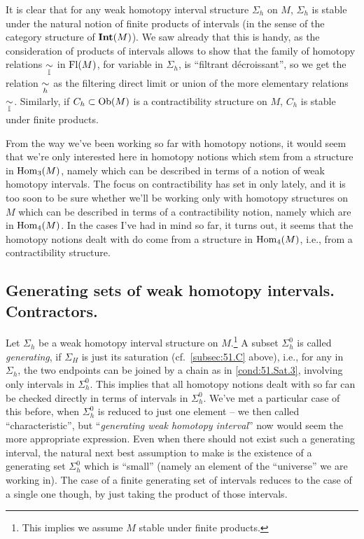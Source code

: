 It is clear that for any weak homotopy interval structure $\Sigma_h$
on $M$, $\Sigma_h$ is stable under the natural notion of finite
products of intervals (in the sense of the category structure of
$\operatorname{\mathbf{Int}}(M)$). We saw already that this is handy, as the consideration
of products of intervals allows to show that the family of homotopy
relations $\mathrel{\underset{{\mathbb{I}}}{\sim}}$ in $\operatorname{Fl}(M)$, for variable \bI{} in $\Sigma_h$, is
``filtrant d\'ecroissant'', so we get the relation $\mathrel{\underset{h}{\sim}}$ as the
filtering direct limit or union of the more elementary relations
$\mathrel{\underset{{\mathbb{I}}}{\sim}}$. Similarly, if $C_h\subset\operatorname{Ob}(M)$ is a contractibility
structure on $M$, $C_h$ is stable under finite products.
\begin{remark}
  From the way we've been working so far with homotopy notions, it
  would seem that we're only interested here in homotopy notions which
  stem from a structure in $\operatorname{Hom}_3(M)$, namely which can be described
  in terms of a notion of weak homotopy intervals. The focus on
  contractibility has set in only lately, and it is too soon to be
  sure whether we'll be working only with homotopy structures on $M$
  which can be described in terms of a contractibility notion, namely
  which are in $\operatorname{Hom}_4(M)$. In the cases I've had in mind so far, it
  turns out, it seems that the homotopy notions dealt with do come
  from a structure in $\operatorname{Hom}_4(M)$, i.e., from a contractibility
  structure.
\end{remark}

\subsection[Generating sets of homotopy intervals. Two standard ways
of generating multiplicative intervals. Contractibility of
\texorpdfstring{$\Hom(X,Y)$}{Hom(X,Y)}'s]{Generating sets of weak
  homotopy intervals. Contractors.}\label{subsec:51.E}
Let $\Sigma_h$ be a weak homotopy interval structure on
$M$.\footnote{This implies we assume $M$ stable under finite
  products.} A subset $\Sigma_h^0$ is called \emph{generating}, if
$\Sigma_H$ is just its saturation (cf.\ \ref{subsec:51.C} above),
i.e., for any \bI{} in $\Sigma_h$, the two endpoints can be joined by
a chain as in \ref{cond:51.Sat.3}, involving only intervals in $\Sigma_h^0$.
This implies that all homotopy notions dealt with so far can be
checked directly in terms of intervals in $\Sigma_h^0$. We've met a
particular case of this before, when $\Sigma_h^0$ is reduced to just
one element \bI{} -- we then called \bI{} ``characteristic'', but
``\emph{generating weak homotopy interval}'' now would seem the more
appropriate expression. Even when there should not exist
such a generating interval, the natural next best assumption to make
is the existence of a generating set $\Sigma_h^0$ which is ``small''
(namely an element of the ``universe'' we are working in). The case of
a finite generating set of intervals reduces to the case of a single
one though, by just taking the product of those intervals.


